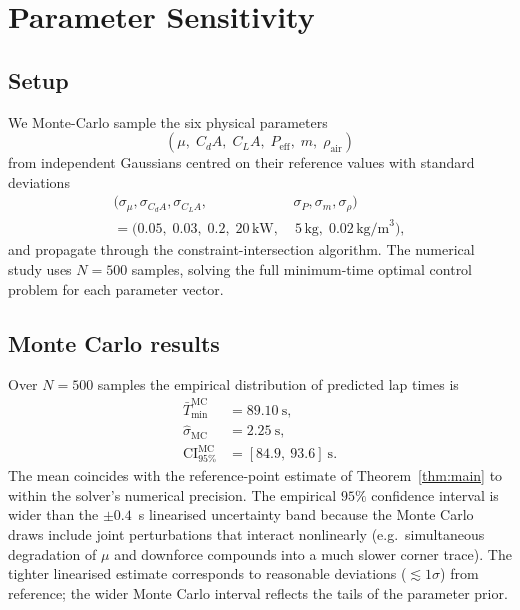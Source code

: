 \documentclass[11pt,twocolumn]{article}
\theoremstyle{definition}
\theoremstyle{remark}
\begin{document}
\section{Parameter Sensitivity}
\label{sec:sensitivity}

\subsection{Setup}

We Monte-Carlo sample the six physical parameters
\[
  (\mu,\; C_d A,\; C_L A,\; P_{\mathrm{eff}},\; m,\; \rho_{\mathrm{air}})
\]
from independent Gaussians centred on their reference values with standard
deviations
\begin{align*}
  (\sigma_\mu, \sigma_{C_dA}, \sigma_{C_LA}, &\,\sigma_P, \sigma_m, \sigma_\rho)\\
  = (0.05,\; 0.03,\; 0.2,\; 20\,\mathrm{kW},&\; 5\,\mathrm{kg},\; 0.02\,\mathrm{kg/m}^3),
\end{align*}
and propagate through the constraint-intersection algorithm. The numerical
study uses $N = 500$ samples, solving the full minimum-time optimal control
problem for each parameter vector.

\subsection{Monte Carlo results}

Over $N = 500$ samples the empirical distribution of predicted lap times is
\begin{align*}
  \bar T_{\min}^{\mathrm{MC}} &= 89.10~\mathrm{s},\\
  \hat\sigma_{\mathrm{MC}} &= 2.25~\mathrm{s},\\
  \mathrm{CI}_{95\%}^{\mathrm{MC}} &= [84.9,\ 93.6]~\mathrm{s}.
\end{align*}
The mean coincides with the reference-point estimate of Theorem~\ref{thm:main}
to within the solver's numerical precision. The empirical $95\%$ confidence
interval is wider than the $\pm 0.4$~s linearised uncertainty band because
the Monte Carlo draws include joint perturbations that interact nonlinearly
(e.g.\ simultaneous degradation of $\mu$ and downforce compounds into a much
slower corner trace). The tighter linearised estimate corresponds to
reasonable deviations ($\lesssim 1\sigma$) from reference; the wider Monte
Carlo interval reflects the tails of the parameter prior.
\end{document}
